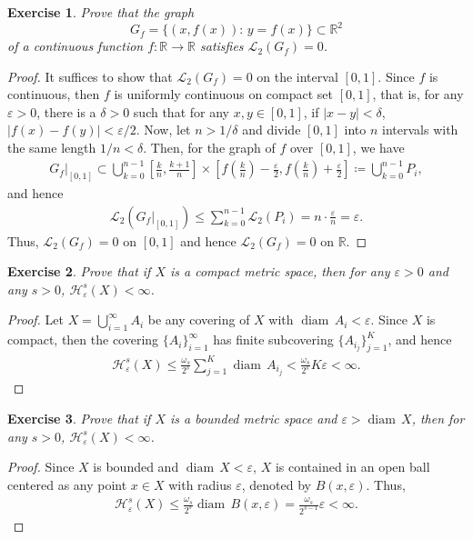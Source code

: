 \documentclass[11pt]{book}
\newtheorem{exercise}{Exercise}[chapter]
\theoremstyle{definition}
\numberwithin{equation}{chapter}
\def\H{{\mathcal H}}
\def\diam{{\operatorname{diam}\,}}
\begin{document}
\medskip

\begin{exercise}
Prove that the graph
$$
G_f=\{(x,f(x)):\, y=f(x)\}\subset\mathbb{R}^2
$$
of a continuous function $f:\mathbb{R}\to\mathbb{R}$ satisfies $\mathcal{L}_2(G_f)=0$.
\end{exercise}
\begin{proof}\cite{26}
It suffices to show that $\mathcal{L}_2(G_f)=0$ on the interval $[0,1]$. Since $f$ is continuous, then $f$ is uniformly continuous on compact set $[0,1]$, that is, for any $\varepsilon > 0$, there is a $\delta > 0$ such that for any $x, y \in [0,1]$, if $\left|x - y\right| < \delta$, $\left|f(x) - f(y)\right| < \varepsilon/2$. Now, let $n > 1/\delta$ and divide $[0,1]$ into $n$ intervals with the same length $1/n < \delta$. Then, for the graph of $f$ over $[0,1]$, we have
\begin{align*}
    G_f|_{[0,1]} \subset \bigcup^{n-1}_{k=0} \left[\frac{k}{n},\frac{k+1}{n}\right] \times \left[f\left(\frac{k}{n}\right) - \frac{\varepsilon}{2},f\left(\frac{k}{n}\right) + \frac{\varepsilon}{2}\right] \coloneqq \bigcup^{n-1}_{k=0} P_i,
\end{align*}
and hence
\begin{align*}
    \mathcal{L}_2\left(G_f|_{[0,1]}\right) \leq \sum^{n-1}_{k=0} \mathcal{L}_2\left(P_i\right) = n \cdot \frac{\varepsilon}{n} = \varepsilon.
\end{align*}
Thus, $\mathcal{L}_2(G_f)=0$ on $[0,1]$ and hence $\mathcal{L}_2(G_f)=0$ on $\mathbb{R}$.
\end{proof}

\medskip

\begin{exercise}
Prove that if $X$ is a compact metric space, then for any $\varepsilon>0$ and any $s>0$, $\H^s_\varepsilon(X)<\infty$.
\end{exercise}
\begin{proof}
Let $X = \bigcup^\infty_{i=1} A_i$ be any covering of $X$ with $\diam A_i < \varepsilon$. Since $X$ is compact, then the covering $\{A_i\}^\infty_{i=1}$ has finite subcovering $\{A_{i_j}\}^K_{j=1}$, and hence
\begin{align*}
    \mathcal{H}^s_{\varepsilon}(X) \leq \frac{\omega_s}{2^s} \sum^K_{j=1} \diam A_{i_j} < \frac{\omega_s}{2^s} K \varepsilon < \infty.
\end{align*}
\end{proof}

\medskip

\begin{exercise}
Prove that if $X$ is a bounded metric space and $\varepsilon>\diam X$, then for any $s>0$, $\H^s_\varepsilon(X)<\infty$.
\end{exercise}
\begin{proof}
Since $X$ is bounded and $\diam X < \varepsilon$, $X$ is contained in an open ball centered as any point $x \in X$ with radius $\varepsilon$, denoted by $B(x,\varepsilon)$. Thus,
\begin{align*}
    \mathcal{H}^s_{\varepsilon}(X) \leq \frac{\omega_s}{2^s} \diam B(x,\varepsilon) = \frac{\omega_s}{2^{s-1}} \varepsilon < \infty.
\end{align*}
\end{proof}
\end{document}
